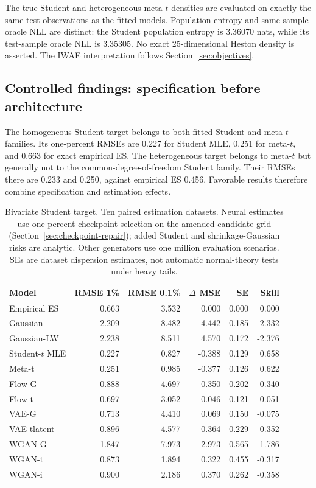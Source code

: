 \documentclass[11pt]{article}
\theoremstyle{definition}\newtheorem{definition}[theorem]{Definition}
\theoremstyle{remark}\newtheorem{remark}[theorem]{Remark}
\begin{document}
The true Student and heterogeneous meta-$t$ densities are evaluated on exactly the same test observations as the fitted models. Population entropy and same-sample oracle NLL are distinct: the Student population entropy is 3.36070 nats, while its test-sample oracle NLL is 3.35305. No exact 25-dimensional Heston density is asserted. The IWAE interpretation follows Section~\ref{sec:objectives}.

\subsection{Controlled findings: specification before architecture}
The homogeneous Student target belongs to both fitted Student and meta-$t$ families. Its one-percent RMSEs are 0.227 for Student MLE, 0.251 for meta-$t$, and 0.663 for exact empirical ES. The heterogeneous target belongs to meta-$t$ but generally not to the common-degree-of-freedom Student family. Their RMSEs there are 0.233 and 0.250, against empirical ES 0.456. Favorable results therefore combine specification and estimation effects.
\begin{table}[htbp]
\centering\footnotesize
\setlength{\tabcolsep}{4pt}
\begin{tabular}{lrrrrr}
\toprule
Model & RMSE 1\% & RMSE 0.1\% & $\Delta$ MSE & SE & Skill \\
\midrule
Empirical ES & 0.663 & 3.532 & 0.000 & 0.000 & 0.000 \\
Gaussian & 2.209 & 8.482 & 4.442 & 0.185 & -2.332 \\
Gaussian-LW & 2.238 & 8.511 & 4.570 & 0.172 & -2.376 \\
Student-$t$ MLE & 0.227 & 0.827 & -0.388 & 0.129 & 0.658 \\
Meta-t & 0.251 & 0.985 & -0.377 & 0.126 & 0.622 \\
Flow-G & 0.888 & 4.697 & 0.350 & 0.202 & -0.340 \\
Flow-t & 0.697 & 3.052 & 0.046 & 0.121 & -0.051 \\
VAE-G & 0.713 & 4.410 & 0.069 & 0.150 & -0.075 \\
VAE-tlatent & 0.896 & 4.577 & 0.364 & 0.229 & -0.352 \\
WGAN-G & 1.847 & 7.973 & 2.973 & 0.565 & -1.786 \\
WGAN-t & 0.873 & 1.894 & 0.322 & 0.455 & -0.317 \\
WGAN-i & 0.900 & 2.186 & 0.370 & 0.262 & -0.358 \\
\bottomrule
\end{tabular}
\caption{Bivariate Student target. Ten paired estimation datasets. Neural estimates use one-percent checkpoint selection on the amended candidate grid (Section~\ref{sec:checkpoint-repair}); added Student and shrinkage-Gaussian risks are analytic. Other generators use one million evaluation scenarios. SEs are dataset dispersion estimates, not automatic normal-theory tests under heavy tails.}\label{tab:r4-syn-t}
\end{table}
\end{document}
